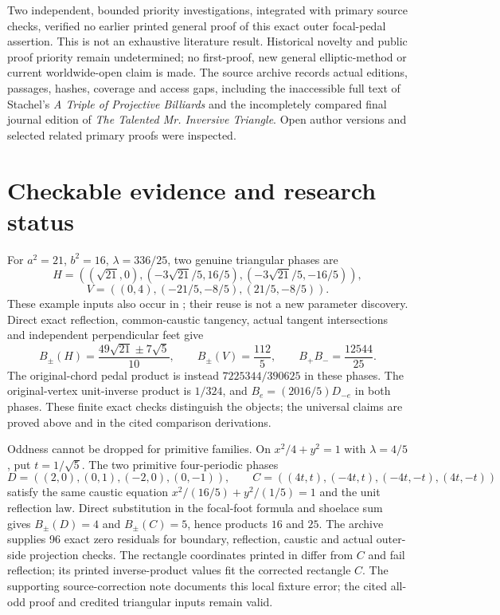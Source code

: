 \documentclass[11pt]{article}
\begin{document}
Two independent, bounded priority investigations, integrated with primary
source checks, verified no earlier printed general proof of this exact
outer focal-pedal assertion. This is not an exhaustive literature result.
Historical novelty and public proof priority remain undetermined; no
first-proof, new general elliptic-method or current worldwide-open claim
is made. The source archive records actual editions, passages, hashes,
coverage and access gaps, including the inaccessible full text of
Stachel's \emph{A Triple of Projective Billiards} and the incompletely
compared final journal edition of \emph{The Talented Mr. Inversive Triangle}.
Open author versions and selected related primary proofs were inspected.

\section{Checkable evidence and research status}
For $a^2=21$, $b^2=16$, $\lambda=336/25$, two genuine triangular phases are
\[
 H=((\sqrt{21},0),(-3\sqrt{21}/5,16/5),(-3\sqrt{21}/5,-16/5)),
\]
\[
 V=((0,4),(-21/5,-8/5),(21/5,-8/5)).
\]
These example inputs also occur in \cite[Section 6]{F62}; their reuse is
not a new parameter discovery. Direct exact reflection, common-caustic
tangency, actual tangent intersections and independent perpendicular feet
give
\[
 B_\pm(H)=\frac{49\sqrt{21}\pm7\sqrt5}{10},\qquad
 B_\pm(V)=\frac{112}{5},\qquad B_+B_-=\frac{12544}{25}.
\]
The original-chord pedal product is instead $7225344/390625$ in these
phases. The original-vertex unit-inverse product is $1/324$, and
$B_e=(2016/5)D_{-e}$ in both phases. These finite exact checks distinguish
the objects; the universal claims are proved above and in the cited
comparison derivations.

Oddness cannot be dropped for primitive families. On $x^2/4+y^2=1$
with $\lambda=4/5$, put $t=1/\sqrt5$. The two primitive four-periodic phases
\[
 D=((2,0),(0,1),(-2,0),(0,-1)),\qquad
 C=((4t,t),(-4t,t),(-4t,-t),(4t,-t))
\]
satisfy the same caustic equation $x^2/(16/5)+y^2/(1/5)=1$ and the unit
reflection law. Direct substitution in the focal-foot formula and shoelace
sum gives $B_\pm(D)=4$ and $B_\pm(C)=5$, hence products $16$ and $25$.
The archive supplies 96 exact zero residuals for boundary, reflection,
caustic and actual outer-side projection checks. The rectangle coordinates
printed in \cite[Section 6, p.~6]{F62} differ from $C$ and fail reflection;
its printed inverse-product values fit the corrected rectangle $C$.
The supporting source-correction note documents this local fixture error;
the cited all-odd proof and credited triangular inputs remain valid.
\end{document}
